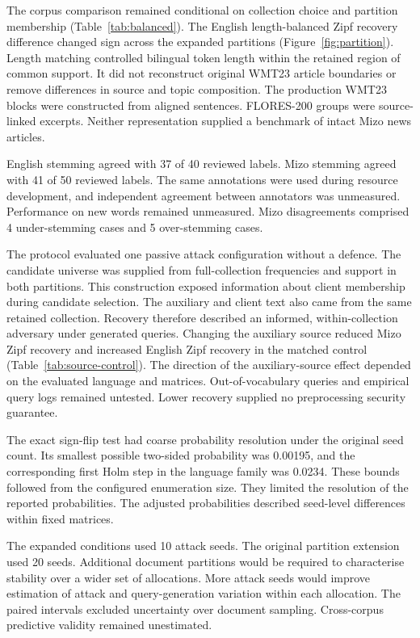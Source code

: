 \documentclass[pdflatex,sn-mathphys-num]{sn-jnl}%
\theoremstyle{thmstyleone}%
\theoremstyle{thmstyletwo}%
\theoremstyle{thmstylethree}%
\newcommand{\EnglishStemMatched}{37}
\newcommand{\EnglishStemTotal}{40}
\newcommand{\MizoStemMatched}{41}
\newcommand{\MizoStemTotal}{50}
\newcommand{\UnderStemming}{4}
\newcommand{\OverStemming}{5}
\newcommand{\SignFlipMinimum}{0.00195}
\newcommand{\LanguageHolmFloor}{0.0234}
\newcommand{\ExpandedSeeds}{10}
\newcommand{\ExtendedSeeds}{20}
\begin{document}
The corpus comparison remained conditional on collection choice and partition membership (Table~\ref{tab:balanced}). The English length-balanced Zipf recovery difference changed sign across the expanded partitions (Figure~\ref{fig:partition}). Length matching controlled bilingual token length within the retained region of common support. It did not reconstruct original WMT23 article boundaries or remove differences in source and topic composition. The production WMT23 blocks were constructed from aligned sentences. FLORES-200 groups were source-linked excerpts. Neither representation supplied a benchmark of intact Mizo news articles.

English stemming agreed with \EnglishStemMatched{} of \EnglishStemTotal{} reviewed labels. Mizo stemming agreed with \MizoStemMatched{} of \MizoStemTotal{} reviewed labels. The same annotations were used during resource development, and independent agreement between annotators was unmeasured. Performance on new words remained unmeasured. Mizo disagreements comprised \UnderStemming{} under-stemming cases and \OverStemming{} over-stemming cases.

The protocol evaluated one passive attack configuration without a defence. The candidate universe was supplied from full-collection frequencies and support in both partitions. This construction exposed information about client membership during candidate selection. The auxiliary and client text also came from the same retained collection. Recovery therefore described an informed, within-collection adversary under generated queries. Changing the auxiliary source reduced Mizo Zipf recovery and increased English Zipf recovery in the matched control (Table~\ref{tab:source-control}). The direction of the auxiliary-source effect depended on the evaluated language and matrices. Out-of-vocabulary queries and empirical query logs remained untested. Lower recovery supplied no preprocessing security guarantee.

The exact sign-flip test had coarse probability resolution under the original seed count. Its smallest possible two-sided probability was \SignFlipMinimum{}, and the corresponding first Holm step in the language family was \LanguageHolmFloor{}. These bounds followed from the configured enumeration size. They limited the resolution of the reported probabilities. The adjusted probabilities described seed-level differences within fixed matrices.

The expanded conditions used \ExpandedSeeds{} attack seeds. The original partition extension used \ExtendedSeeds{} seeds. Additional document partitions would be required to characterise stability over a wider set of allocations. More attack seeds would improve estimation of attack and query-generation variation within each allocation. The paired intervals excluded uncertainty over document sampling. Cross-corpus predictive validity remained unestimated.
\end{document}
